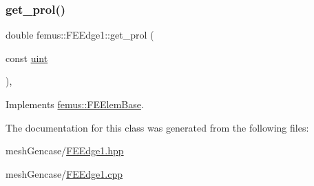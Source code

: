 \subsubsection{\texorpdfstring{get\+\_\+prol()}{get\_prol()}}
{\footnotesize\ttfamily double femus\+::\+F\+E\+Edge1\+::get\+\_\+prol (\begin{DoxyParamCaption}\item[{const \mbox{\hyperlink{_typedefs_8hpp_a91ad9478d81a7aaf2593e8d9c3d06a14}{uint}}}]{ }\end{DoxyParamCaption})\hspace{0.3cm}{\ttfamily [inline]}, {\ttfamily [virtual]}}



Implements \mbox{\hyperlink{classfemus_1_1_f_e_elem_base_ac82326cdc7cb02329c7be9547d56fad4}{femus\+::\+F\+E\+Elem\+Base}}.



The documentation for this class was generated from the following files\+:\begin{DoxyCompactItemize}
\item 
mesh\+Gencase/\mbox{\hyperlink{_f_e_edge1_8hpp}{F\+E\+Edge1.\+hpp}}\item 
mesh\+Gencase/\mbox{\hyperlink{_f_e_edge1_8cpp}{F\+E\+Edge1.\+cpp}}\end{DoxyCompactItemize}
